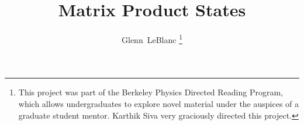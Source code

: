 \documentclass[12pt]{article}
\begin{document}
\title{Matrix Product States}
%
%
%
\author{Glenn~LeBlanc
\thanks{This project was part of the Berkeley Physics Directed
Reading Program, which allows undergraduates to explore novel
material under the auspices of a graduate student mentor. Karthik Siva
very graciously directed this project.}}

\maketitle
\end{document}
